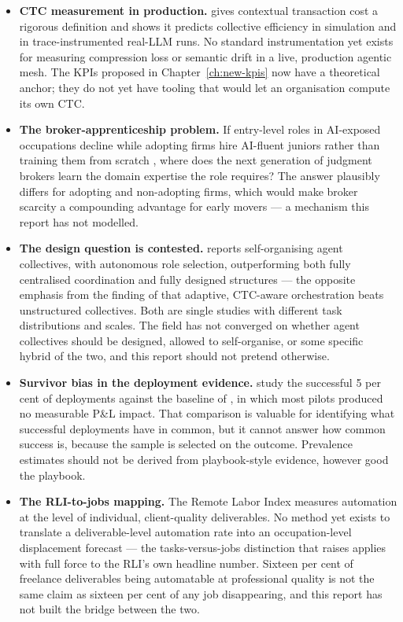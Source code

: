\begin{itemize}
  \item \textbf{CTC measurement in production.} \textcite{Liu2026} gives contextual transaction cost a rigorous definition and shows it predicts collective efficiency in simulation and in trace-instrumented real-LLM runs. No standard instrumentation yet exists for measuring compression loss or semantic drift in a live, production agentic mesh. The KPIs proposed in Chapter~\ref{ch:new-kpis} now have a theoretical anchor; they do not yet have tooling that would let an organisation compute its own CTC.
  \item \textbf{The broker-apprenticeship problem.} If entry-level roles in AI-exposed occupations decline \parencite{Brynjolfsson2025Canaries} while adopting firms hire AI-fluent juniors rather than training them from scratch \parencite{RampRevelio2026}, where does the next generation of judgment brokers learn the domain expertise the role requires? The answer plausibly differs for adopting and non-adopting firms, which would make broker scarcity a compounding advantage for early movers --- a mechanism this report has not modelled.
  \item \textbf{The design question is contested.} \textcite{Dochkina2026} reports self-organising agent collectives, with autonomous role selection, outperforming both fully centralised coordination and fully designed structures --- the opposite emphasis from the finding of \textcite{Liu2026} that adaptive, CTC-aware orchestration beats unstructured collectives. Both are single studies with different task distributions and scales. The field has not converged on whether agent collectives should be designed, allowed to self-organise, or some specific hybrid of the two, and this report should not pretend otherwise.
  \item \textbf{Survivor bias in the deployment evidence.} \textcite{Pereira2026Playbook} study the successful 5 per cent of deployments against the baseline of \textcite{MITNANDA2025}, in which most pilots produced no measurable P\&L impact. That comparison is valuable for identifying what successful deployments have in common, but it cannot answer how common success is, because the sample is selected on the outcome. Prevalence estimates should not be derived from playbook-style evidence, however good the playbook.
  \item \textbf{The RLI-to-jobs mapping.} The Remote Labor Index measures automation at the level of individual, client-quality deliverables. No method yet exists to translate a deliverable-level automation rate into an occupation-level displacement forecast --- the tasks-versus-jobs distinction that \textcite{Chatterji2026} raises applies with full force to the RLI's own headline number. Sixteen per cent of freelance deliverables being automatable at professional quality is not the same claim as sixteen per cent of any job disappearing, and this report has not built the bridge between the two.
\end{itemize}

